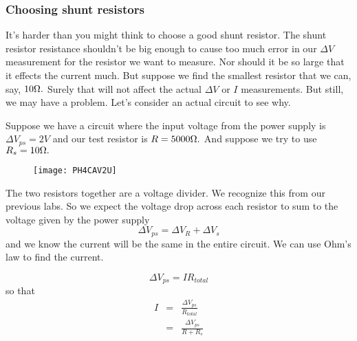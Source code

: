 \subsubsection{Choosing shunt resistors}

It's harder than you might think to choose a good shunt resistor. The shunt
resistor resistance shouldn't be big enough to cause too much error in our $%
\Delta V$ measurement for the resistor we want to measure. Nor should it be
so large that it effects the current much. But suppose we find the smallest
resistor that we can, say, $10\unit{%
\Omega%
}.$ Surely that will not affect the actual $\Delta V$ or $I$ measurements.
But still, we may have a problem. Let's consider an actual circuit to see
why.

Suppose we have a circuit where the input voltage from the power supply is $%
\Delta V_{ps}=2\unit{V}$ and our test resistor is $R=5000\unit{%
\Omega%
}.$ And suppose we try to use $R_{s}=10\unit{%
\Omega%
}.$ \begin{figure}[h!]
\texttt{[image: PH4CAV2U]}
\end{figure}

The two resistors together are a voltage divider. We recognize this from our
previous labs. So we expect the voltage drop across each resistor to sum to
the voltage given by the power supply%
\begin{equation*}
\Delta V_{ps}=\Delta V_{R}+\Delta V_{s}
\end{equation*}%
and we know the current will be the same in the entire circuit. We can use
Ohm's law to find the current.

\begin{equation*}
\Delta V_{ps}=IR_{total}
\end{equation*}%
so that 
\begin{eqnarray*}
I &=&\frac{\Delta V_{ps}}{R_{total}} \\
&=&\frac{\Delta V_{ps}}{R+R_{s}}
\end{eqnarray*}

